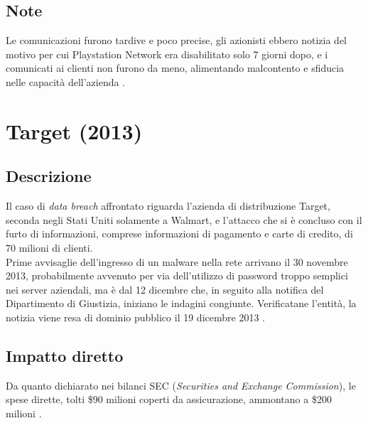 \documentclass[12pt,a4paper,twoside]{report}
\begin{document}
\subsection{Note}
Le comunicazioni furono tardive e poco precise, gli azionisti ebbero notizia del motivo per cui Playstation Network era disabilitato solo 7 giorni dopo, e i comunicati ai clienti non furono da meno, alimentando malcontento e sfiducia nelle capacit\`a dell'azienda \cite{Sony_pnt}.
\section{Target (2013)}
\subsection{Descrizione}
Il caso di \textit{data breach} affrontato riguarda l'azienda di distribuzione Target, seconda negli Stati Uniti solamente a Walmart, e l'attacco che si \`e concluso con il furto di  informazioni, comprese informazioni di pagamento e carte di credito, di 70 milioni di clienti.\\
Prime avvisaglie dell'ingresso di un malware nella rete arrivano il 30 novembre 2013, probabilmente avvenuto per via dell'utilizzo di password troppo semplici nei server aziendali, ma \`e dal 12 dicembre che, in seguito alla notifica del Dipartimento di Giustizia, iniziano le indagini congiunte. Verificatane l'entit\`a, la notizia viene resa di dominio pubblico il 19 dicembre 2013 \cite{Target}.\\
\subsection{Impatto diretto}
Da quanto dichiarato nei bilanci SEC (\textit{Securities and Exchange Commission}), le spese dirette, tolti \$90 milioni coperti da assicurazione, ammontano a \$200 milioni \cite{Target}.
\end{document}
